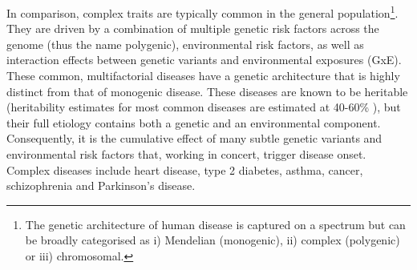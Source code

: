 

In comparison, complex traits are typically common in the general population\footnote{The genetic architecture of human disease is captured on a spectrum \cite{manolio2009finding} but can be broadly categorised as i) Mendelian (monogenic), ii) complex (polygenic) or iii) chromosomal.}.
They are driven by a combination of multiple genetic risk factors across the genome (thus the name polygenic), environmental risk factors, as well as interaction effects between genetic variants and environmental exposures (GxE).
These common, multifactorial diseases have a genetic architecture that is highly distinct from that of monogenic disease. 
These diseases are known to be heritable (heritability estimates for most common diseases are estimated at 40-60\% \cite{manolio2009finding, prokopenko2009variants, kathiresan2008six, zeggini2008meta, harley2008genome}), but their full etiology contains both a genetic and an environmental component.
Consequently, it is the cumulative effect of many subtle genetic variants and environmental risk factors that, working in concert, trigger disease onset.
Complex diseases include heart disease, type 2 diabetes, asthma, cancer, schizophrenia and Parkinson's disease.\\

